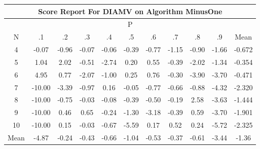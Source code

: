 \documentclass[11pt,a4paper]{report}
\begin{document}
\begin{longtable}{ | c || c | c | c | c | c | c | c | c | c || c |}
\hline
\multicolumn{11}{|c|}{ Score Report For DIAMV on Algorithm MinusOne} \\
\hline
\multicolumn{11}{|c|}{ P } \\
\hline
N & .1 & .2 & .3 & .4 & .5 & .6 & .7 & .8 & .9 & Mean\\
 \hline
 \hline
 \endhead
  4 &  \cellcolor[HTML]{FFFFFF} -0.07 &  \cellcolor[HTML]{FFE7E7} -0.96 &  \cellcolor[HTML]{FFFFFF} -0.07 &  \cellcolor[HTML]{FFFFFF} -0.06 &  \cellcolor[HTML]{FFF7F7} -0.39 &  \cellcolor[HTML]{FFEFEF} -0.77 &  \cellcolor[HTML]{FFDFDF} -1.15 &  \cellcolor[HTML]{FFE7E7} -0.90 &  \cellcolor[HTML]{FFD7D7} -1.66 & -0.672 \\
  5 &  \cellcolor[HTML]{E7E7FF} 1.04 &  \cellcolor[HTML]{CFCFFF} 2.02 &  \cellcolor[HTML]{FFEFEF} -0.51 &  \cellcolor[HTML]{FFB7B7} -2.74 &  \cellcolor[HTML]{F7F7FF} 0.20 &  \cellcolor[HTML]{EFEFFF} 0.55 &  \cellcolor[HTML]{FFF7F7} -0.39 &  \cellcolor[HTML]{FFCFCF} -2.02 &  \cellcolor[HTML]{FFDFDF} -1.34 & -0.354 \\
  6 &  \cellcolor[HTML]{8080FF} 4.95 &  \cellcolor[HTML]{EFEFFF} 0.77 &  \cellcolor[HTML]{FFC7C7} -2.07 &  \cellcolor[HTML]{FFE7E7} -1.00 &  \cellcolor[HTML]{F7F7FF} 0.25 &  \cellcolor[HTML]{EFEFFF} 0.76 &  \cellcolor[HTML]{FFF7F7} -0.30 &  \cellcolor[HTML]{FF9F9F} -3.90 &  \cellcolor[HTML]{FF9F9F} -3.70 & -0.471 \\
  7 &  \cellcolor[HTML]{FF0000} -10.00 &  \cellcolor[HTML]{FFA7A7} -3.39 &  \cellcolor[HTML]{FFE7E7} -0.97 &  \cellcolor[HTML]{F7F7FF} 0.16 &  \cellcolor[HTML]{FFFFFF} -0.05 &  \cellcolor[HTML]{FFEFEF} -0.77 &  \cellcolor[HTML]{FFEFEF} -0.66 &  \cellcolor[HTML]{FFE7E7} -0.88 &  \cellcolor[HTML]{FF8F8F} -4.32 & -2.320 \\
  8 &  \cellcolor[HTML]{FF0000} -10.00 &  \cellcolor[HTML]{FFEFEF} -0.75 &  \cellcolor[HTML]{FFFFFF} -0.03 &  \cellcolor[HTML]{FFFFFF} -0.08 &  \cellcolor[HTML]{FFF7F7} -0.39 &  \cellcolor[HTML]{FFEFEF} -0.50 &  \cellcolor[HTML]{FFF7F7} -0.19 &  \cellcolor[HTML]{BFBFFF} 2.58 &  \cellcolor[HTML]{FFA7A7} -3.63 & -1.444 \\
  9 &  \cellcolor[HTML]{FF0000} -10.00 &  \cellcolor[HTML]{F7F7FF} 0.46 &  \cellcolor[HTML]{EFEFFF} 0.65 &  \cellcolor[HTML]{FFF7F7} -0.24 &  \cellcolor[HTML]{FFDFDF} -1.30 &  \cellcolor[HTML]{FFAFAF} -3.18 &  \cellcolor[HTML]{FFF7F7} -0.39 &  \cellcolor[HTML]{EFEFFF} 0.59 &  \cellcolor[HTML]{FF9F9F} -3.70 & -1.901 \\
  10 &  \cellcolor[HTML]{FF0000} -10.00 &  \cellcolor[HTML]{FFFFFF} 0.15 &  \cellcolor[HTML]{FFFFFF} -0.03 &  \cellcolor[HTML]{FFEFEF} -0.67 &  \cellcolor[HTML]{FF7070} -5.59 &  \cellcolor[HTML]{F7F7FF} 0.17 &  \cellcolor[HTML]{EFEFFF} 0.52 &  \cellcolor[HTML]{F7F7FF} 0.24 &  \cellcolor[HTML]{FF7070} -5.72 & -2.325 \\
 \hline
 \hline
Mean &  \cellcolor[HTML]{FF8787} -4.87 &  \cellcolor[HTML]{FFF7F7} -0.24 &  \cellcolor[HTML]{FFF7F7} -0.43 &  \cellcolor[HTML]{FFEFEF} -0.66 &  \cellcolor[HTML]{FFE7E7} -1.04 &  \cellcolor[HTML]{FFEFEF} -0.53 &  \cellcolor[HTML]{FFF7F7} -0.37 &  \cellcolor[HTML]{FFEFEF} -0.61 &  \cellcolor[HTML]{FFA7A7} -3.44 &  \cellcolor[HTML]{FFDFDF} -1.36
\end{longtable}
\end{document}
